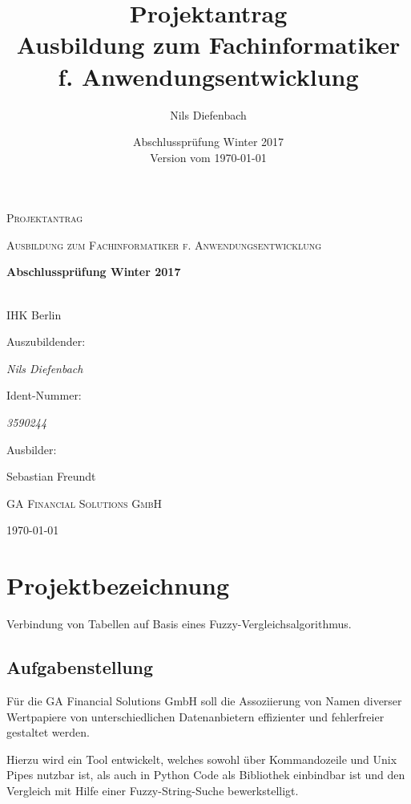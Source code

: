 \documentclass[fontsize=12pt,paper=a4,draft=off,titlepage=off]{scrartcl}
\title{Projektantrag\\ \textbf{Ausbildung zum Fachinformatiker f. Anwendungsentwicklung}}
\author{Nils Diefenbach}
\date{Abschlussprüfung Winter 2017\\ \small{Version vom \today}}
\begin{document}
\pagestyle{fancy}

\begin{titlepage}
\centering
{\scshape\LARGE Projektantrag\par}
\vspace{1cm}
{\scshape\Large Ausbildung zum Fachinformatiker f. Anwendungsentwicklung\par}
\vspace{1.5cm}
{\huge\bfseries Abschlussprüfung Winter 2017\par\\IHK Berlin\par}
\vspace{2cm}
Auszubildender:\par
{\Large\itshape Nils Diefenbach\par}
Ident-Nummer:\par
{\Large\itshape 3590244\par}
\vfill
Ausbilder:\par
Sebastian Freundt\par \textsc{GA Financial Solutions GmbH}
\vfill
{\large \today\par}
\end{titlepage}

\clearpage

\tableofcontents{}

\clearpage

\section{Projektbezeichnung}
Verbindung von Tabellen auf Basis eines Fuzzy-Vergleichsalgorithmus.\par

\subsection{Aufgabenstellung}
Für die GA Financial Solutions GmbH soll die Assoziierung von Namen diverser
Wertpapiere von unterschiedlichen Datenanbietern effizienter und fehlerfreier
gestaltet werden.\par
Hierzu wird ein Tool entwickelt, welches sowohl über Kommandozeile und Unix
Pipes nutzbar ist, als auch in Python Code als Bibliothek einbindbar ist und
den Vergleich mit Hilfe einer Fuzzy-String-Suche bewerkstelligt.\par
\end{document}
